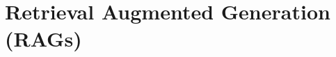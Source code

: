 \cleardoublepage

\chapter{Retrieval Augmented Generation (RAGs)}
\label{Retrieval Augmented Generation (RAGs)}